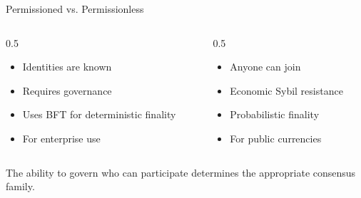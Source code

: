 \documentclass[aspectratio=169]{beamer}
\begin{document}
\begin{frame}{Permissioned vs. Permissionless}
\begin{columns}[T]
    \begin{column}{0.5\linewidth}
        \begin{tcolorbox}[enhanced, colback=d2s.fg!30, colframe=black, fonttitle=\bfseries, title={Permissioned}, rounded corners, drop shadow]
            \begin{itemize}
                \item Identities are known
                \item Requires governance
                \item Uses BFT for deterministic finality
                \item For enterprise use
            \end{itemize}
        \end{tcolorbox}
    \end{column}
    \begin{column}{0.5\linewidth}
        \begin{tcolorbox}[enhanced, colback=d2s.fg!30, colframe=black, fonttitle=\bfseries, title={Permissionless}, rounded corners, drop shadow]
            \begin{itemize}
                \item Anyone can join
                \item Economic Sybil resistance
                \item Probabilistic finality
                \item For public currencies
            \end{itemize}
        \end{tcolorbox}
    \end{column}
\end{columns}
\vfill
\begin{tcolorbox}[enhanced, colback=red!20, colframe=red!75!black, fonttitle=\bfseries, title={The Deciding Factor: Identity}, rounded corners, drop shadow]
    The ability to govern who can participate determines the appropriate consensus family.
\end{tcolorbox}
\end{frame}
\end{document}
